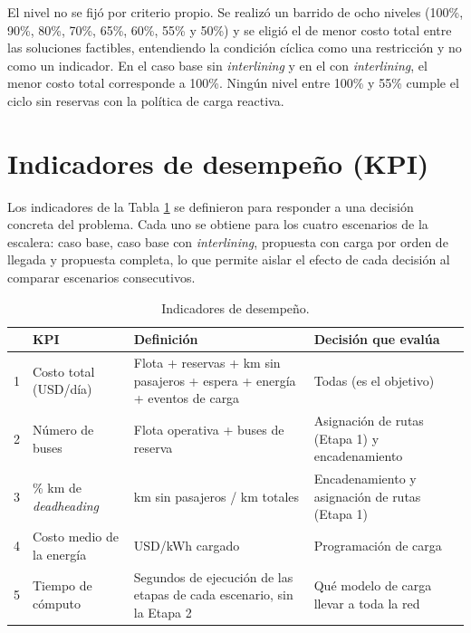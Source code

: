 El nivel no se fijó por criterio propio. Se realizó un barrido de ocho niveles (100\%, 90\%, 80\%, 70\%, 65\%, 60\%, 55\% y 50\%) y se eligió el de menor costo total entre las soluciones factibles, entendiendo la condición cíclica como una restricción y no como un indicador. En el caso base sin \textit{interlining} y en el con \textit{interlining}, el menor costo total corresponde a 100\%. Ningún nivel entre 100\% y 55\% cumple el ciclo sin reservas con la política de carga reactiva.


\section{Indicadores de desempeño (KPI)}
\label{sec:kpis-informe2}
Los indicadores de la Tabla \ref{tab:kpis-def} se definieron para responder a una decisión concreta del problema. Cada uno se obtiene para los cuatro escenarios de la escalera: caso base, caso base con \textit{interlining}, propuesta con carga por orden de llegada y propuesta completa, lo que permite aislar el efecto de cada decisión al comparar escenarios consecutivos.

\begin{table}[H]
\centering
\small
\begin{tabular}{lp{3.6cm}p{4.6cm}p{4.2cm}}
\toprule
 & KPI & Definición & Decisión que evalúa \\
\midrule
1 & Costo total (USD/día) & Flota + reservas + km sin pasajeros + espera + energía + eventos de carga & Todas (es el objetivo) \\
2 & Número de buses & Flota operativa + buses de reserva & Asignación de rutas (Etapa 1) y encadenamiento \\
3 & \% km de \textit{deadheading} & km sin pasajeros / km totales & Encadenamiento y asignación de rutas (Etapa 1) \\
4 & Costo medio de la energía & USD/kWh cargado & Programación de carga \\
5 & Tiempo de cómputo & Segundos de ejecución de las etapas de cada escenario, sin la Etapa 2 & Qué modelo de carga llevar a toda la red \\
\bottomrule
\end{tabular}
\caption{Indicadores de desempeño.}
\label{tab:kpis-def}
\end{table}
